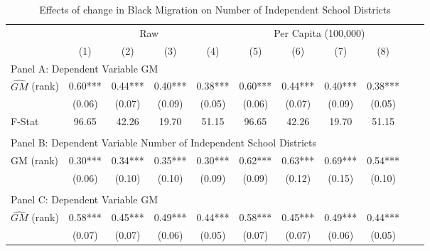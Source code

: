  \begin{table}[htbp]\centering {} \begin{threeparttable} \caption{Effects of change in Black Migration on Number of Independent School Districts} \begin{tabular}{l*{10}{c}} \toprule
                &\multicolumn{4}{c}{Raw}                                    &\multicolumn{4}{c}{Per Capita (100,000)}                   \\\cmidrule(lr){2-5}\cmidrule(lr){6-9}
                &\multicolumn{1}{c}{(1)}   &\multicolumn{1}{c}{(2)}   &\multicolumn{1}{c}{(3)}   &\multicolumn{1}{c}{(4)}   &\multicolumn{1}{c}{(5)}   &\multicolumn{1}{c}{(6)}   &\multicolumn{1}{c}{(7)}   &\multicolumn{1}{c}{(8)}   \\
\cmidrule(lr){1-9}
\multicolumn{8}{l}{Panel A: Dependent Variable GM}\\
\cmidrule(lr){1-9}
$\hat{GM}$ (rank)&       0.60***&       0.44***&       0.40***&       0.38***&       0.60***&       0.44***&       0.40***&       0.38***\\
                &     (0.06)   &     (0.07)   &     (0.09)   &     (0.05)   &     (0.06)   &     (0.07)   &     (0.09)   &     (0.05)   \\
\midrule
F-Stat          &      96.65   &      42.26   &      19.70   &      51.15   &      96.65   &      42.26   &      19.70   &      51.15   \\
\cmidrule[\heavyrulewidth](lr){1-9} \\ \cmidrule[\heavyrulewidth](lr){1-9}
\multicolumn{8}{l}{Panel B: Dependent Variable Number of Independent School Districts}\\
\cmidrule(lr){1-9}
GM  (rank)      &       0.30***&       0.34***&       0.35***&       0.30***&       0.62***&       0.63***&       0.69***&       0.54***\\
                &     (0.06)   &     (0.10)   &     (0.10)   &     (0.09)   &     (0.09)   &     (0.12)   &     (0.15)   &     (0.10)   \\
\cmidrule[\heavyrulewidth](lr){1-9} \\ \cmidrule[\heavyrulewidth](lr){1-9}
\multicolumn{8}{l}{Panel C: Dependent Variable GM}\\
\cmidrule(lr){1-9}
$\hat{GM}$ (rank)&       0.58***&       0.45***&       0.49***&       0.44***&       0.58***&       0.45***&       0.49***&       0.44***\\
                &     (0.07)   &     (0.07)   &     (0.06)   &     (0.05)   &     (0.07)   &     (0.07)   &     (0.06)   &     (0.05)   \\

\end{tabular}
\end{threeparttable}
\end{table}
